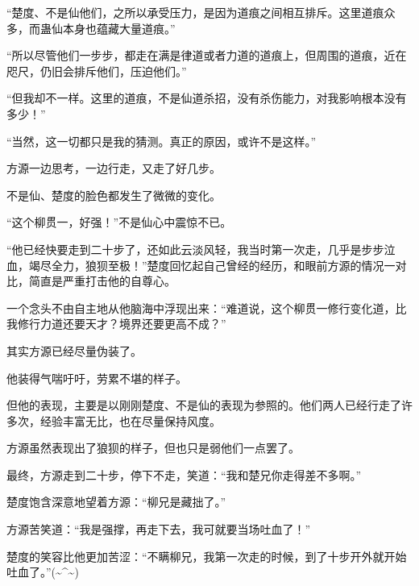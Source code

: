 \begin{this_body}
“楚度、不是仙他们，之所以承受压力，是因为道痕之间相互排斥。这里道痕众多，而蛊仙本身也蕴藏大量道痕。”

“所以尽管他们一步步，都走在满是律道或者力道的道痕上，但周围的道痕，近在咫尺，仍旧会排斥他们，压迫他们。”

“但我却不一样。这里的道痕，不是仙道杀招，没有杀伤能力，对我影响根本没有多少！”

“当然，这一切都只是我的猜测。真正的原因，或许不是这样。”

方源一边思考，一边行走，又走了好几步。

不是仙、楚度的脸色都发生了微微的变化。

“这个柳贯一，好强！”不是仙心中震惊不已。

“他已经快要走到二十步了，还如此云淡风轻，我当时第一次走，几乎是步步泣血，竭尽全力，狼狈至极！”楚度回忆起自己曾经的经历，和眼前方源的情况一对比，简直是严重打击他的自尊心。

一个念头不由自主地从他脑海中浮现出来：“难道说，这个柳贯一修行变化道，比我修行力道还要天才？境界还要更高不成？”

其实方源已经尽量伪装了。

他装得气喘吁吁，劳累不堪的样子。

但他的表现，主要是以刚刚楚度、不是仙的表现为参照的。他们两人已经行走了许多次，经验丰富无比，也在尽量保持风度。

方源虽然表现出了狼狈的样子，但也只是弱他们一点罢了。

最终，方源走到二十步，停下不走，笑道：“我和楚兄你走得差不多啊。”

楚度饱含深意地望着方源：“柳兄是藏拙了。”

方源苦笑道：“我是强撑，再走下去，我可就要当场吐血了！”

楚度的笑容比他更加苦涩：“不瞒柳兄，我第一次走的时候，到了十步开外就开始吐血了。”(\~{}\^{}\~{})

\end{this_body}

